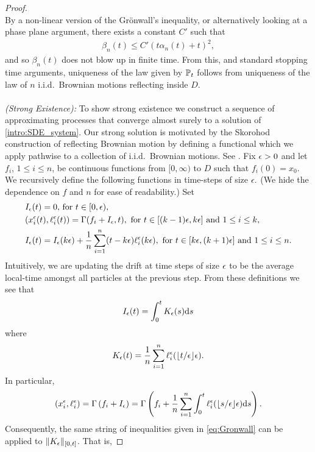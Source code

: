 \begin{proof}
\[	\]
	By a non-linear version of the Gr\"onwall's inequality, or alternatively looking at a phase plane argument, there exists a constant $C'$ such that 
	\begin{align}\label{eq:bound_drift}
		\beta_n(t) \leq C'(t\alpha_n(t) + t)^2,
	\end{align}
	and so $\beta_n(t)$ does not blow up in finite time. From this, and standard stopping time arguments, uniqueness of the law given by $\mathbb{P}_t$ follows from uniqueness of the law of $n$ i.i.d.\ Brownian motions reflecting inside $D$.
	\\
	\\
	\emph{(Strong Existence):}
	To show strong existence we construct a sequence of approximating processes that converge almost surely to a solution of \eqref{intro:SDE_system}. Our strong solution is motivated by the Skorohod construction of reflecting Brownian motion by defining a functional which we apply pathwise to a collection of i.i.d.\ Brownian motions. See \cite[Theorem 2.5]{barnes2020hydrodynamic}. Fix $\epsilon > 0$ and let $f_i$, $1 \leq i \leq n$, be continuous functions from $[0, \infty)$
	to $D$ such that $f_i(0) = x_0.$ We recursively define the following functions in time-steps of size $\epsilon.$ (We hide the dependence on $f$ and $n$ for ease of readability.) Set
	\begin{align}
		&I_\epsilon(t) = 0, \,\text{for $t \in [0, \epsilon)$},\\
		&(x_i^\epsilon(t), \ell_i^\epsilon(t)) = \Gamma(f_i + I_\epsilon,t), \text{ for $t \in [(k-1)\epsilon, k\epsilon]$ and $1\leq i \leq k$},\\
		&I_\epsilon(t) = I_\epsilon(k\epsilon) + \frac{1}{n}\sum_{i = 1}^n(t - k\epsilon)\ell_i^\epsilon(k\epsilon), \text{ for $t \in [k\epsilon, (k+1)\epsilon]$ and $1 \leq i \leq n$}.
	\end{align}
	Intuitively, we are updating the drift at time steps of size $\epsilon$ to be the average local-time amongst all particles at the previous step. From these definitions we see that
	\[
	I_\epsilon(t) = \int_0^tK_\epsilon(s)\mathrm{d} s
	\]
	where
	\begin{equation}
		K_\epsilon(t) = \frac{1}{n}\sum_{i = 1}^n \ell_i^\epsilon(\lfloor t/\epsilon \rfloor \epsilon)\label{eq:S_Existence3}.
	\end{equation}
	In particular,
	\[
	(x_i^\epsilon, \ell_i^\epsilon) = \Gamma\left(f_i + I_\epsilon\right) = \Gamma\left(f_i + \frac{1}{n}\sum_{i = 1}^n\int_0^t\ell_i^\epsilon(\lfloor s/\epsilon \rfloor \epsilon)\mathrm{d} s\right).
	\]
	Consequently, the same string of inequalities given in \eqref{eq:Gronwall} can be applied to $\|K_\epsilon\|_{[0, t]}$. That is,
	

\end{proof}
